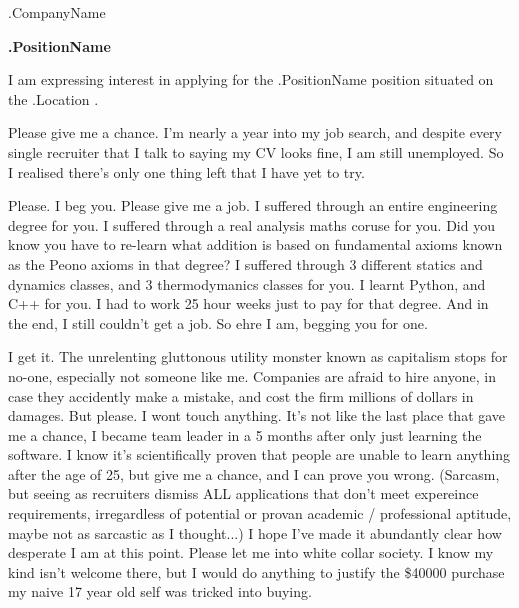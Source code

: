 \documentclass[10pt]{letter}
\begin{document}


\thispagestyle{empty}

\address{Dennis Onishi \\
    definitelynotdeon@gmail.com \\ 
    (+61) 0430 342 826
}

\begin{letter}{
    {{ .CompanyName }}
} 

\signature{Deon}

\opening{}

\textbf{
    {{ .PositionName }} 
}

I am expressing interest in applying for the {{ .PositionName }} position situated on the {{ .Location }}. 

Please give me a chance. I'm nearly a year into my job search, and despite every single recruiter that I talk to saying my CV looks fine, I am still unemployed. So I realised there's only one thing left that I have yet to try. 

Please. I beg you. Please give me a job. I suffered through an entire engineering degree for you. I suffered through a real analysis maths coruse for you. Did you know you have to re-learn what addition is based on fundamental axioms known as the Peono axioms in that degree? I suffered through 3 different statics and dynamics classes, and 3 thermodymanics classes for you. I learnt Python, and C++ for you. I had to work 25 hour weeks just to pay for that degree. And in the end, I still couldn't get a job. So ehre I am, begging you for one. 

I get it. The unrelenting gluttonous utility monster known as capitalism stops for no-one, especially not someone like me. Companies are afraid to hire anyone, in case they accidently make a mistake, and cost the firm millions of dollars in damages. But please. I wont touch anything. It's not like the last place that gave me a chance, I became team leader in a 5 months after only just learning the software. I know it's scientifically proven that people are unable to learn anything after the age of 25, but give me a chance, and I can prove you wrong. (Sarcasm, but seeing as recruiters dismiss ALL applications that don't meet expereince requirements, irregardless of potential or provan academic / professional aptitude, maybe not as sarcastic as I thought...) I hope I've made it abundantly clear how desperate I am at this point. Please let me into white collar society. I know my kind isn't welcome there, but I would do anything to justify the \$40000 purchase my naive 17 year old self was tricked into buying. 


\end{letter}
\end{document}
